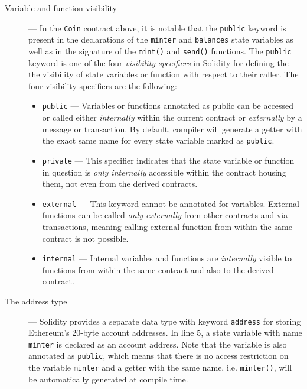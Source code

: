 \begin{description}
\item[Variable and function visibility] --- In the \texttt{Coin} contract above, it is notable that the \texttt{public} keyword is present in the declarations of the \texttt{minter} and \texttt{balances} state variables as well as in the signature of the \texttt{mint()} and \texttt{send()} functions. The \texttt{public} keyword is one of the four \textit{visibility specifiers} in Solidity for defining the the visibility of state variables or function with respect to their caller. The four visibility specifiers are the following: 
		\begin{itemize}
			\item \texttt{public} ---  Variables or functions annotated as public can be accessed or called either \textit{internally} within the current contract or \textit{externally} by a message or transaction. By default, compiler will generate a getter with the exact same name for every state variable marked as \texttt{public}.

			\item \texttt{private} --- This specifier indicates that the state variable or function in question is \textit{only internally} accessible within the contract housing them, not even from the derived contracts.

			\item \texttt{external} --- This keyword cannot be annotated for variables. External functions can be called \textit{only externally} from other contracts and via transactions, meaning calling external function from within the same contract is not possible.

			\item \texttt{internal} --- Internal variables and functions are \textit{internally} visible to functions from within the same contract and also to the derived contract.
		\end{itemize}

\item[The address type] --- Solidity provides a separate data type with keyword \texttt{address} for storing Ethereum's 20-byte account addresses. In line 5, a state variable with name \texttt{minter} is declared as an account address. Note that the variable is also annotated as \texttt{public}, which means that there is no access restriction on the variable \texttt{minter} and a getter with the same name, i.e. \texttt{minter()}, will be automatically generated at compile time. 


\end{description}
